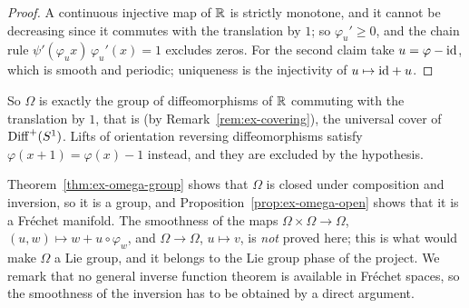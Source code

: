 \begin{proof}
  \leanok
  A continuous injective map of $\mathbb{R}$ is strictly monotone, and it cannot be decreasing since it
  commutes with the translation by $1$; so $\varphi_u' \ge 0$, and the chain rule
  $\psi'(\varphi_u x)\,\varphi_u'(x) = 1$ excludes zeros. For the second claim take
  $u = \varphi - \mathrm{id}$, which is smooth and periodic; uniqueness is the injectivity of
  $u \mapsto \mathrm{id} + u$.
\end{proof}

So $\Omega$ is exactly the group of diffeomorphisms of $\mathbb{R}$ commuting with the translation by $1$,
that is (by Remark~\ref{rem:ex-covering}), the universal cover of $\operatorname{Diff}^+(S^1)$. Lifts of
orientation reversing diffeomorphisms satisfy $\varphi(x + 1) = \varphi(x) - 1$ instead, and
they are excluded by the hypothesis.

\begin{remark}
  Theorem~\ref{thm:ex-omega-group} shows that $\Omega$ is closed under composition and
  inversion, so it is a group, and Proposition~\ref{prop:ex-omega-open} shows that it is a
  Fréchet manifold. The smoothness of the maps $\Omega \times \Omega \to \Omega$,
  $(u, w) \mapsto w + u \circ \varphi_w$, and $\Omega \to \Omega$, $u \mapsto v$, is
  \emph{not} proved here; this is what would make $\Omega$ a Lie group, and it belongs to the
  Lie group phase of the project. We remark that no general inverse function theorem is
  available in Fréchet spaces, so the smoothness of the inversion has to be obtained by a
  direct argument.
\end{remark}
